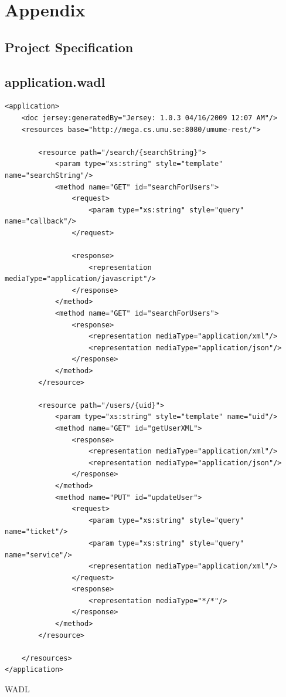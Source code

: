 \documentclass[titlepage, twocolumn, a4paper, 10pt]{article}
\begin{document}
\newpage
\appendix
{}
\section{Appendix}\label{sec:app}
\subsection{Project Specification}\label{app:ps}
\newpage
\subsection{application.wadl}\label{app:wadl}
\begin{code}
  \begin{footnotesize}
\begin{verbatim}
<application>
	<doc jersey:generatedBy="Jersey: 1.0.3 04/16/2009 12:07 AM"/>
	<resources base="http://mega.cs.umu.se:8080/umume-rest/">
		
		<resource path="/search/{searchString}">
			<param type="xs:string" style="template" name="searchString"/>
			<method name="GET" id="searchForUsers">	
				<request>
					<param type="xs:string" style="query" name="callback"/>
				</request>
				
				<response>
					<representation mediaType="application/javascript"/>
				</response>
			</method>
			<method name="GET" id="searchForUsers">
		   		<response>
		   			<representation mediaType="application/xml"/>
		   			<representation mediaType="application/json"/>
		   		</response>
			</method>
		</resource>
			
		<resource path="/users/{uid}">
			<param type="xs:string" style="template" name="uid"/>
			<method name="GET" id="getUserXML">
				<response>
					<representation mediaType="application/xml"/>
					<representation mediaType="application/json"/>
				</response>
			</method>
			<method name="PUT" id="updateUser">
				<request>
					<param type="xs:string" style="query" name="ticket"/>
					<param type="xs:string" style="query" name="service"/>
					<representation mediaType="application/xml"/>
				</request>
				<response>
					<representation mediaType="*/*"/>
				</response>
			</method>
		</resource>
		
	</resources>
</application>
\end{verbatim}
  \end{footnotesize}
  \caption{WADL}\label{code:wadl}
\end{code}
\end{document}
